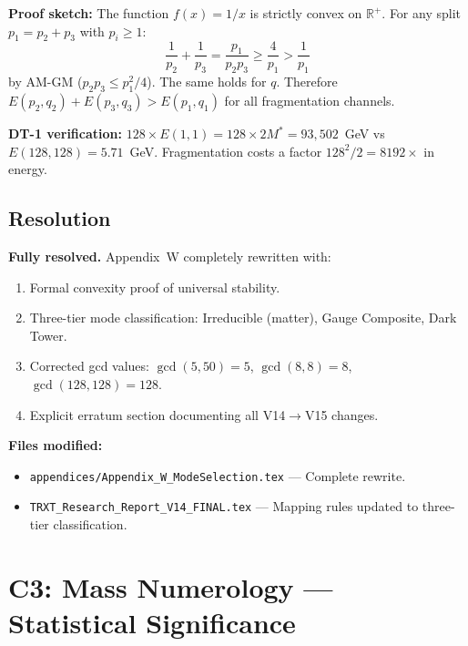 \documentclass[11pt,a4paper]{article}
\begin{document}
\textbf{Proof sketch:} The function $f(x) = 1/x$ is strictly convex on $\mathbb{R}^+$.  For any split $p_1 = p_2 + p_3$ with $p_i \ge 1$:
\begin{equation}
    \frac{1}{p_2} + \frac{1}{p_3} = \frac{p_1}{p_2 p_3} \ge \frac{4}{p_1} > \frac{1}{p_1}
\end{equation}
by AM-GM ($p_2 p_3 \le p_1^2/4$).  The same holds for $q$.  Therefore $E(p_2,q_2) + E(p_3,q_3) > E(p_1,q_1)$ for all fragmentation channels.

\textbf{DT-1 verification:} $128 \times E(1,1) = 128 \times 2M^* = 93{,}502$~GeV vs $E(128,128) = 5.71$~GeV.  Fragmentation costs a factor $128^2/2 = 8192\times$ in energy.

\subsection{Resolution}
\begin{mdframed}[backgroundcolor=green!5]
\textbf{Fully resolved.}  Appendix~W completely rewritten with:
\begin{enumerate}
    \item Formal convexity proof of universal stability.
    \item Three-tier mode classification: Irreducible (matter), Gauge Composite, Dark Tower.
    \item Corrected gcd values: $\gcd(5,50) = 5$, $\gcd(8,8) = 8$, $\gcd(128,128) = 128$.
    \item Explicit erratum section documenting all V14$\to$V15 changes.
\end{enumerate}
\end{mdframed}

\textbf{Files modified:}
\begin{itemize}
    \item \texttt{appendices/Appendix\_W\_ModeSelection.tex} --- Complete rewrite.
    \item \texttt{TRXT\_Research\_Report\_V14\_FINAL.tex} --- Mapping rules updated to three-tier classification.
\end{itemize}

\section{C3: Mass Numerology --- Statistical Significance}
\label{sec:C3}
\end{document}
